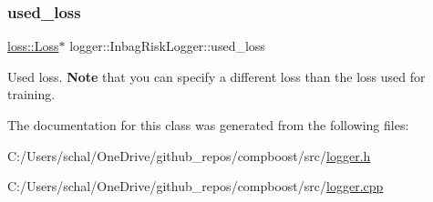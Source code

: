 \subsubsection{\texorpdfstring{used\+\_\+loss}{used\_loss}}
{\footnotesize\ttfamily \mbox{\hyperlink{classloss_1_1_loss}{loss\+::\+Loss}}$\ast$ logger\+::\+Inbag\+Risk\+Logger\+::used\+\_\+loss\hspace{0.3cm}{\ttfamily [private]}}



Used loss. {\bfseries Note} that you can specify a different loss than the loss used for training. 



The documentation for this class was generated from the following files\+:\begin{DoxyCompactItemize}
\item 
C\+:/\+Users/schal/\+One\+Drive/github\+\_\+repos/compboost/src/\mbox{\hyperlink{logger_8h}{logger.\+h}}\item 
C\+:/\+Users/schal/\+One\+Drive/github\+\_\+repos/compboost/src/\mbox{\hyperlink{logger_8cpp}{logger.\+cpp}}\end{DoxyCompactItemize}
